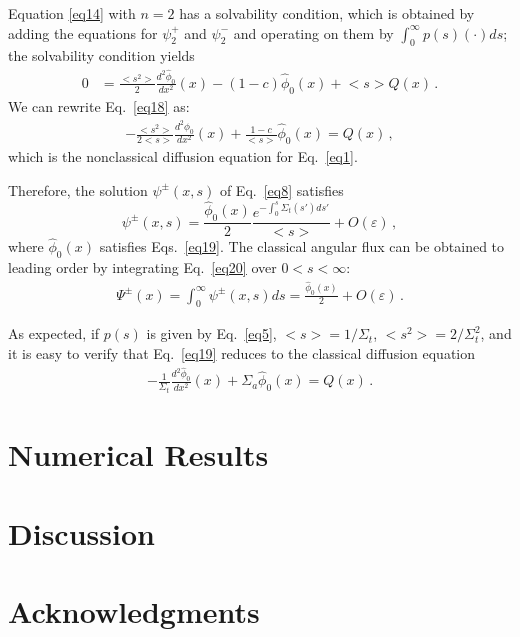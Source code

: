 \documentclass{anstrans}
\newcommand{\bl}{\big<}
\newcommand{\bg}{\big>}
\begin{document}
 Equation \eqref{eq14} with $n=2$ has a solvability condition, which is obtained by adding the equations for $\psi_2^+$ and $\psi_2^-$ and operating on them by $\int_0^{\infty} p(s) ( \cdot ) ds $; the solvability condition yields
   \begin{align}\label{eq18}
      0 &= \frac{\bl s^2\bg}{2}\frac{d^2\hat\phi_0}{dx^2}(x) - (1-c)\hat\phi_0( x) + \bl s\bg Q( x)\,.
   \end{align}
We can rewrite Eq.\ \eqref{eq18} as:
\begin{align}
      -\frac{\bl s^2\bg}{2\bl s\bg}\frac{d^2\hat\phi_0}{dx^2}(x) + \frac{1-c}{\bl s\bg } \hat\phi_0(x) = Q(x)\,,\label{eq19}
      \end{align}
which is the nonclassical diffusion equation for Eq.\ \eqref{eq1}.

Therefore, the solution $\psi^\pm(x, s)$ of Eq.\ \eqref{eq8} satisfies
   \begin{equation}\label{eq20}
      \psi^\pm(x, s) = \frac{\hat\phi_0(x)}{2} \frac{e^{- \int_0^s \Sigma_t( s') ds'}} {\bl s\bg} + O(\varepsilon) \,,
   \end{equation} 
where $\hat\phi_0(x)$ satisfies Eqs.\ \eqref{eq19}. The classical angular flux can be obtained to leading order by integrating Eq.\ \eqref{eq20} over $0 < s < \infty$:
   \begin{align}
   \Psi^\pm(x) = \int_0^{\infty}\psi^\pm(x,s)ds = \frac{\hat\phi_0(x)}{2}+ O(\varepsilon) \,.
   \label{5.26}
   \end{align}

As expected, if $p(s)$ is given by Eq.\ \eqref{eq5}, $\bl s\bg = 1/\Sigma_t$, $\bl s^2\bg = 2/\Sigma_t^2$, and it is easy to verify that Eq.\ \eqref{eq19} reduces to the classical diffusion equation
\begin{align}
 -\frac{1}{\Sigma_t}\frac{d^2\hat\phi_0}{dx^2}(x) + \Sigma_a \hat\phi_0(x) = Q(x)\,.
\end{align}


\section{Numerical Results}

\section{Discussion}

\section{Acknowledgments}



\end{document}

